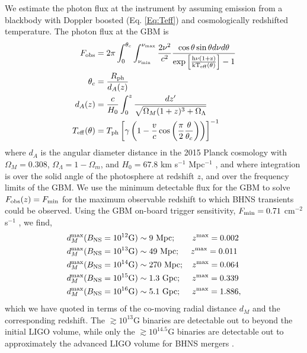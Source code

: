 We estimate the photon flux at the instrument by assuming emission
from a blackbody with Doppler boosted (Eq. \ref{Eq:Teff}) and
cosmologically redshifted temperature. The photon flux at the GBM is
\begin{align}
F_{\rm{obs}} &= 2 \pi \int^{\theta_c}_{0}\int^{\nu_{\rm{max}}}_{\nu_{\rm{min}}}{  \frac{2 \nu^2}{ c^2} \frac{\cos{\theta} \sin{\theta} d \nu d\theta}{\rm{exp\left[\frac{h \nu (1+z)}{ k T_{\rm{eff}}(\theta)}\right] - 1} }  }  \\ \nonumber
%
\theta_c &=\frac{R_{\rm{ph}}}{d_A(z)}  \\ \nonumber
%
d_A(z) &= \frac{c}{H_0} \int^z_0{\frac{dz'}{\sqrt{\Omega_M(1+z)^3 + \Omega_{\Lambda}}}}   \\ \nonumber
%
T_{\rm{eff}}(\theta)&= T_{\rm{ph}}\left[ \gamma \left( 1 - \frac{v}{c} \cos{\left( \frac{\pi}{2} \frac{\theta}{\theta_c}\right) } \right)\right]^{-1}
\end{align}
where $d_A$ is the angular diameter distance in the 2015 Planck
cosmology with $\Omega_M = 0.308$, $\Omega_{\Lambda} = 1-\Omega_m$,
and $H_0 = 67.8$ km s$^{-1}$ Mpc$^{-1}$
\citep{Planck:2015:CosmoParams}, and where integration is over the
solid angle of the photosphere at redshift $z$, and over the frequency
limits of the GBM. We use the minimum detectable flux for the GBM to
solve $F_{\rm{obs}}(z) = F_{\rm{min}}$ for the maximum observable
redshift to which BHNS transients could be observed. Using the GBM
on-board trigger sensitivity, $F_{\rm{min}} = 0.71$ cm$^{-2}$ s$^{-1}$
\citep{FERMIGBM:2015}, we find,
\begin{align}
d^{\rm max}_M (B_{\rm NS} = 10^{12} \mbox{G}) &\sim 9 \  \mbox{Mpc};  \ \ \ \quad z^{\rm{max}} = 0.002   \nonumber \\ 
d^{\rm max}_M (B_{\rm NS} = 10^{13} \mbox{G}) &\sim 49 \  \mbox{Mpc};  \ \quad z^{\rm{max}} = 0.011   \nonumber \\ 
d^{\rm max}_M (B_{\rm NS} = 10^{14} \mbox{G}) &\sim 270 \  \mbox{Mpc};  \quad z^{\rm{max}} = 0.064   \nonumber \\
d^{\rm max}_M (B_{\rm NS} = 10^{15} \mbox{G}) &\sim 1.3 \  \mbox{Gpc};  \ \quad z^{\rm{max}} = 0.339   \nonumber \\
d^{\rm max}_M (B_{\rm NS} = 10^{16} \mbox{G}) & \sim 5.1 \  \mbox{Gpc};  \ \quad z^{\rm{max}} = 1.886,
\end{align}
which we have quoted in terms of the co-moving radial distance $d_M$
and the corresponding redshift. The $\gtrsim 10^{13}$G binaries are
detectable out to beyond the initial LIGO volume, while only the
$\gtrsim 10^{14.5}$G binaries are detectable out to approximately the
advanced LIGO volume for BHNS mergers \citep[redshift
  $z\sim0.1$;][]{LIGORates:2010}.


